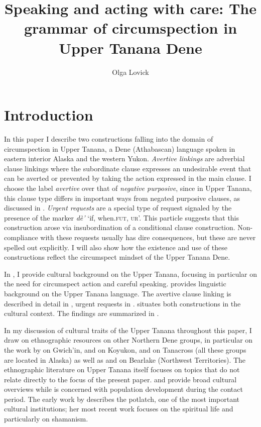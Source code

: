 \documentclass[output=paper,colorlinks,citecolor=brown
]{langscibook}
\title[Speaking and acting with care]
      {Speaking and acting with care: The grammar of circumspection in Upper Tanana Dene}
\author{Olga Lovick\affiliation{University of Saskatchewan}}
\begin{document}
\maketitle

\section{Introduction}
\label{section:intro}

In this paper I describe two constructions falling into the domain of circumspection in Upper Tanana, a Dene (Athabascan) language spoken in eastern interior Alaska and the western Yukon. 
\textit{Avertive linkings} are adverbial clause linkings where the subordinate clause expresses an undesirable event that can be averted or prevented by taking the action expressed in the main clause. I choose the label \textit{avertive} over that of \textit{negative purposive}, since in Upper Tanana, this clause type differs in important ways from negated purposive clauses, as discussed in . \textit{Urgent requests} are a special type of request signaled by the presence of the marker \textit{dè'} `if, when.\textsc{fut}, \textsc{ur}'. This particle suggests that this construction arose via insubordination of a conditional clause construction. Non-compliance with these requests usually has dire consequences, but these are never spelled out explicitly. I will also show how the existence and use of these constructions reflect the circumspect mindset of the Upper Tanana Dene.

In , I provide cultural background on the Upper Tanana, focusing in particular on the need for circumspect action and careful speaking.  provides linguistic background on the Upper Tanana language. The avertive clause linking is described in detail in , urgent requests in .  situates both constructions in the cultural context. The findings are summarized in .

In my discussion of cultural traits of the Upper Tanana throughout this paper, I draw on ethnographic resources on other Northern Dene groups, in particular on the work by \citet{NelsonR1973} on Gwich'in, \citet{NelsonRMautnerKBaneG1982} and \citet{NelsonR1983} on Koyukon, and \citet{ScollonRScollonS1981} on Tanacross (all these groups are located in Alaska) as well as \citet{RushforthS1985} and \citet{RushforthSChisholmJ1991} on Bearlake (Northwest Territories). The ethnographic literature on Upper Tanana itself focuses on topics that do not relate directly to the focus of the present paper. \citet{McKennanR1959} and \citet{McKennanR1981} provide broad cultural overviews while \citet{McKennanR1969} is concerned with population development during the contact period. The early work by \citet{GuedonMF1974, GuedonMF1981} describes the potlatch, one of the most important cultural institutions; her most recent work \citep{GuedonMF2005} focuses on the spiritual life and particularly on shamanism. 
\end{document}
